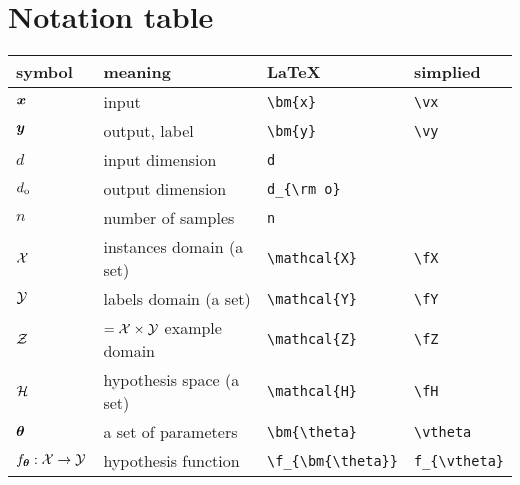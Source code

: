 \documentclass{article}
\begin{document}
\section{Notation table}
\begin{center}
    \begin{tabular}{llll}
        \toprule
        symbol                                              & meaning                                 & \LaTeX                  & simplied                \\
        \midrule

        $\bm{x}$                                               & input                                   & \verb!\bm{x}!  & \verb!\vx!  \\
        $\bm{y}$                                               & output, label                           & \verb!\bm{y}!  & \verb!\vy!  \\
        $d$                                                 & input dimension                         & \verb!d!  &                         \\
        $d_{\rm o}$                                         & output dimension                        & \verb!d_{\rm o}!  &                         \\
        $n$                                                 & number of samples                       & \verb!n!                            \\
        $\mathcal{X}$
                                                            & instances domain (a set)                & \verb!\mathcal{X}!  & \verb!\fX!  \\
        $\mathcal{Y}$
                                                            & labels domain (a set)                   & \verb!\mathcal{Y}! & \verb!\fY! \\
        $\mathcal{Z}$                                               & $=\mathcal{X}\times\mathcal{Y}$ example domain          & \verb!\mathcal{Z}! & \verb!\fZ! \\
        $\mathcal{H}$                                               & hypothesis space (a set)                & \verb!\mathcal{H}! & \verb!\fH! \\
        $\bm{\theta}$                                           & a set of parameters                     & \verb!\bm{\theta}! & \verb!\vtheta! \\
        $f_{\bm{\theta}}:\mathcal{X}\to \mathcal{Y}$                            & hypothesis function                     & \verb!\f_{\bm{\theta}}! & \verb!f_{\vtheta}! \\

\end{tabular}
\end{center}
\end{document}
